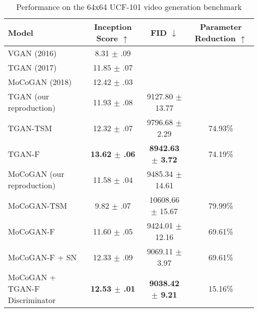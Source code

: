 \documentclass[a4paper,fleqn]{cas-sc}
\begin{document}
\begin{table}[pos=!h]
\centering
\caption{Performance on the 64x64 UCF-101 video generation benchmark}
\label{table:ldvd_is64}
    \begin{tabular}{lccc}
    \hline Model                                           & Inception Score $\uparrow$             & FID $\downarrow$ &     Parameter Reduction $\uparrow$    \\
    \hline
    VGAN \cite{VondrickPT16generating} (2016)       & 8.31 $\pm$ .09                        &                 &                           \\
    TGAN \cite{SaitoMS17temporal} (2017)           & 11.85 $\pm$ .07                       &                 &                           \\
    MoCoGAN \cite{Tulyakov0YK18mocogan} (2018)     & 12.42 $\pm$ .03                       &                 &                           \\
    
    \hline
    TGAN (our reproduction)                            & 11.93 $\pm$ .08                      & 9127.80 $\pm$ 13.77           &                        \\
    TGAN-TSM                                        & 12.32 $\pm$ .07                   &   9796.68 $\pm$ 2.29          &           74.93\%     \\
    TGAN-F                                       & \textbf{13.62 $\pm$ .06}             &   \textbf{8942.63 $\pm$ 3.72} &   74.19\%          \\
    \hline
    MoCoGAN  (our reproduction)                          & 11.58 $\pm$ .04                      & 9485.34 $\pm$ 14.61           &                        \\
    MoCoGAN-TSM                                     & 9.82 $\pm$ .07                    &  10608.66 $\pm$ 15.67         &   79.99\%            \\

    MoCoGAN-F                                    & 11.60 $\pm$ .05                       &   9424.01 $\pm$ 12.16        &           69.61\%         \\
    
    MoCoGAN-F + SN                               & 12.33 $\pm$ .09                       &   9069.11 $\pm$ 3.97         &           69.61\%         \\
    MoCoGAN + TGAN-F Discriminator               & \textbf{12.53 $\pm$ .01}              & \textbf{9038.42 $\pm$ 9.21}  &           15.16\%         \\

    \hline \end{tabular}
\end{table}
\end{document}
